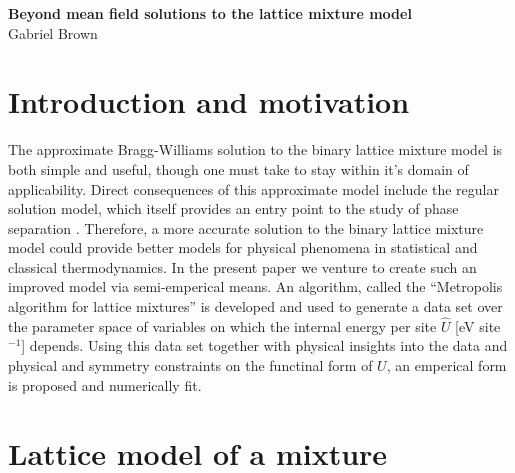 \documentclass[10pt]{article}
\begin{document}
\begin{center}
    \textbf{\large Beyond mean field solutions to the lattice mixture model} \\
    Gabriel Brown
\end{center}


\section{Introduction and motivation}
The approximate Bragg-Williams solution to the binary lattice mixture model is both simple and useful, though one must take to stay within it's domain of applicability.
Direct consequences of this approximate model include the regular solution model, which itself provides an entry point to the study of phase separation \cite{dill}.
Therefore, a more accurate solution to the binary lattice mixture model could provide better models for physical phenomena in statistical and classical thermodynamics.
In the present paper we venture to create such an improved model via semi-emperical means.
An algorithm, called the ``Metropolis algorithm for lattice mixtures'' is developed and used to generate a data set over the parameter space of variables on which the internal energy per site $\hat{U}$ [eV site$^{-1}$] depends.
Using this data set together with physical insights into the data and physical and symmetry constraints on the functinal form of $U$, an emperical form is proposed and numerically fit.


\section{Lattice model of a mixture} 
\end{document}
